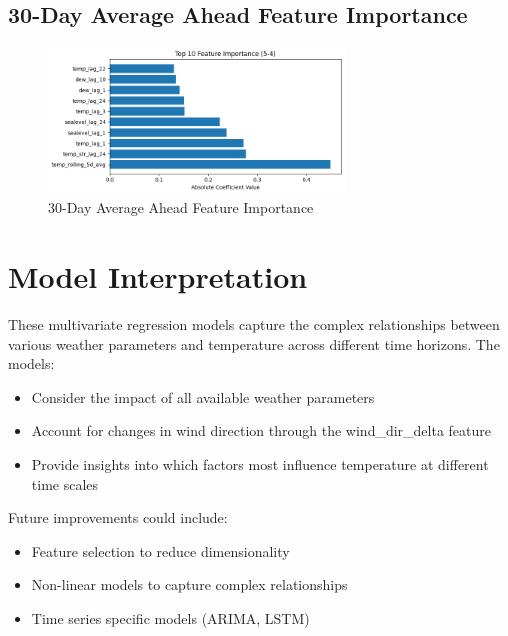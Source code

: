\subsection{30-Day Average Ahead Feature Importance}
\begin{figure}[htbp]
\centering
\includegraphics[width=0.7\textwidth]{5-4-linear_temp_feature_importance.png}
\caption{30-Day Average Ahead Feature Importance}
\label{fig:30-day_average_ahead_featimp}
\end{figure}


\section{Model Interpretation}

These multivariate regression models capture the complex relationships between various weather parameters and temperature across different time horizons. The models:\
\begin{itemize}
  \item Consider the impact of all available weather parameters
  \item Account for changes in wind direction through the wind\_dir\_delta feature
  \item Provide insights into which factors most influence temperature at different time scales
\end{itemize}
Future improvements could include:\
\begin{itemize}
  \item Feature selection to reduce dimensionality
  \item Non-linear models to capture complex relationships
  \item Time series specific models (ARIMA, LSTM)
\end{itemize}


